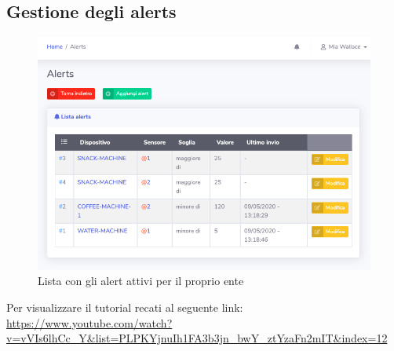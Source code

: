 \subsection{Gestione degli alerts}
\begin{figure}[H]
		\centering
		\includegraphics[scale=0.600]{res/images/mod/listaAlerts.png}
		\caption{Lista con gli alert attivi per il proprio ente}
	\end{figure}
Per visualizzare il tutorial recati al seguente link: 
\url{https://www.youtube.com/watch?v=vVIs6lhCc_Y&list=PLPKYjnuIh1FA3b3jn_bwY_ztYzaFn2mIT&index=12}

